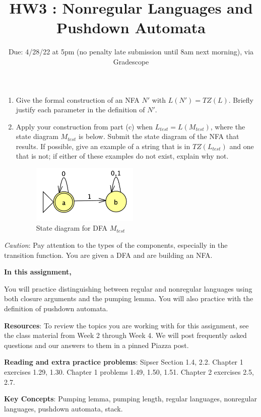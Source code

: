 \documentclass[12pt, oneside]{article}
\begin{document}
\begin{enumerate}
\begin{enumerate}
\item Give the formal construction of an NFA $N'$ with $L(N') = TZ(L)$.  Briefly justify 
each parameter in the definition of  $N'$. 
\item Apply your construction from part (c)  when $L_{test} = L(M_{test})$, where the 
state diagram $M_{test}$ is below.  Submit the state diagram of the NFA that results.
If possible, give an example of a string that is in $TZ(L_{test})$ and one that is not; if either of these examples
do not exist, explain why not.
\begin{figure}[h]
   \centering
   \includegraphics[width=2in]{../../resources/machines/MtestDFA.png}
   \caption{State diagram for DFA $M_{test}$}
\end{figure}
\end{enumerate}
{\it Caution}: Pay attention to the types of the components, especially
in the transition function.  You are given a DFA and are building an NFA.
\end{enumerate}
\newpage

\title{HW3 : Nonregular Languages and Pushdown Automata}
\date{Due: 4/28/22 at 5pm (no penalty late submission until 8am next morning), via Gradescope}


\maketitle
\thispagestyle{fancy}

{\bf In this assignment,}

You will practice distinguishing between regular and nonregular languages using both closure
arguments and the pumping lemma. You will also practice with the definition of pushdown automata.

{\bf Resources}: To review the topics you are working with 
for this assignment, see the class material from  Week 2 through Week 4.
We will post frequently asked questions and our answers to them in a 
pinned Piazza post.

{\bf Reading and extra practice problems}: Sipser Section 1.4, 2.2.
Chapter 1 exercises 1.29, 1.30. Chapter 1 problems 1.49, 1.50, 1.51. Chapter 2 exercises 2.5, 2.7.

{\bf Key Concepts}: Pumping lemma, pumping length, regular languages, 
nonregular languages, pushdown automata, stack.
\end{document}
